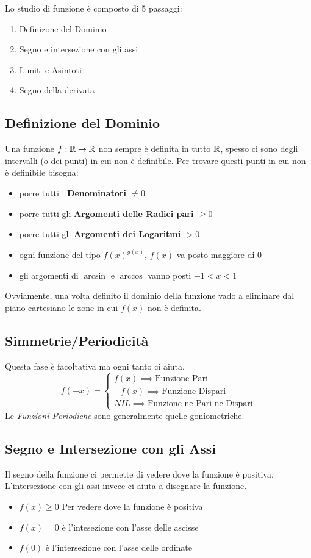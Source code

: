 \documentclass[12pt, a4paper, openany]{book}
\begin{document}
Lo studio di funzione è composto di 5 passaggi:
\begin{enumerate}
	\item Definizone del Dominio
 \item Segno e intersezione con gli assi
 \item Limiti e Asintoti
 \item Segno della derivata
\end{enumerate}

\subsection*{Definizione del Dominio}
Una funzione $f:\mathbb{R} \to \mathbb{R}$ non sempre è definita in tutto $\mathbb{R}$, spesso ci sono degli intervalli (o dei punti) in cui non è definibile.
Per trovare questi punti in cui non è definibile bisogna:
\begin{itemize}
	\item porre tutti i \textbf{Denominatori $\neq 0$}
 \item porre tutti gli \textbf{Argomenti delle Radici pari $\geq 0$}
 \item porre tutti gli \textbf{Argomenti dei Logaritmi $>0$}
 \item ogni funzione del tipo $f(x)^{g(x)}$, $f(x)$ va posto maggiore di 0
 \item gli argomenti di $\arcsin$ e $\arccos$ vanno posti $-1 < x <1$
\end{itemize}
Ovviamente, una volta definito il dominio della funzione vado a eliminare dal piano cartesiano le zone in cui $f(x)$ non è definita.
\subsection*{Simmetrie/Periodicità}
Questa fase è facoltativa ma ogni tanto ci aiuta.
\begin{equation}
	f(-x) = \begin{cases}
		f(x) \implies \text{Funzione Pari}\\
		-f(x) \implies \text{Funzione Dispari}\\
		NIL \implies \text{Funzione ne Pari ne Dispari}
	\end{cases}
\end{equation}
Le \emph{Funzioni Periodiche} sono generalmente quelle goniometriche.

\subsection*{Segno e Intersezione con gli Assi}
Il segno della funzione ci permette di vedere dove la funzione è positiva.
L'intersezione con gli assi invece ci aiuta a disegnare la funzione.
\begin{itemize}
	\item $f(x)\geq 0$ Per vedere dove la funzione è positiva
 \item $f(x)=0$ è l'intesezione con l'asse delle ascisse
 \item $f(0)$ è l'intersezione con l'asse delle ordinate
\end{itemize}
\end{document}

